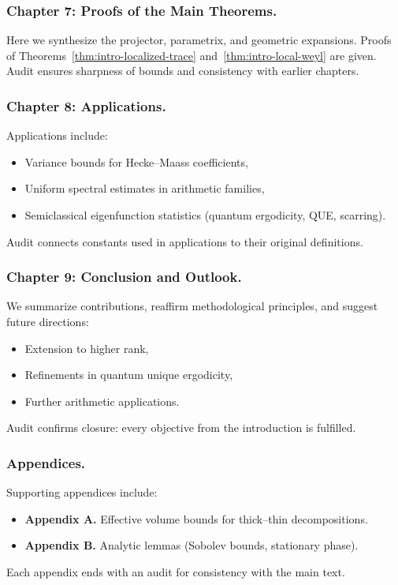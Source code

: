 \subsubsection*{Chapter 7: Proofs of the Main Theorems.}
Here we synthesize the projector, parametrix, and geometric expansions.
Proofs of Theorems~\ref{thm:intro-localized-trace} and~\ref{thm:intro-local-weyl} are given.
Audit ensures sharpness of bounds and consistency with earlier chapters.

\subsubsection*{Chapter 8: Applications.}
Applications include:
\begin{itemize}
  \item Variance bounds for Hecke–Maass coefficients,
  \item Uniform spectral estimates in arithmetic families,
  \item Semiclassical eigenfunction statistics (quantum ergodicity, QUE, scarring).
\end{itemize}
Audit connects constants used in applications to their original definitions.

\subsubsection*{Chapter 9: Conclusion and Outlook.}
We summarize contributions, reaffirm methodological principles,
and suggest future directions:
\begin{itemize}
  \item Extension to higher rank,
  \item Refinements in quantum unique ergodicity,
  \item Further arithmetic applications.
\end{itemize}
Audit confirms closure: every objective from the introduction is fulfilled.

\subsubsection*{Appendices.}
Supporting appendices include:
\begin{itemize}
  \item \textbf{Appendix A.} Effective volume bounds for thick–thin decompositions.
  \item \textbf{Appendix B.} Analytic lemmas (Sobolev bounds, stationary phase).
\end{itemize}
Each appendix ends with an audit for consistency with the main text.

